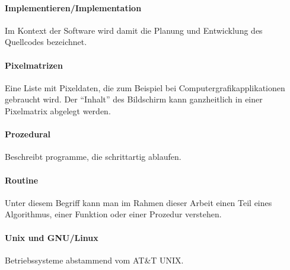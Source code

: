 \paragraph{Implementieren/Implementation} Im Kontext der Software wird damit die Planung und Entwicklung des Quellcodes bezeichnet.
\paragraph{Pixelmatrizen} Eine Liste mit Pixeldaten, die zum Beispiel bei Computergrafikapplikationen gebraucht wird. Der ``Inhalt'' des Bildschirm kann ganzheitlich in einer Pixelmatrix abgelegt werden.
\paragraph{Prozedural} Beschreibt programme, die schrittartig ablaufen.
\paragraph{Routine} Unter diesem Begriff kann man im Rahmen dieser Arbeit einen Teil eines Algorithmus, einer Funktion oder einer Prozedur verstehen.
\paragraph{Unix und GNU/Linux} Betriebssysteme abstammend vom AT\&T UNIX.
